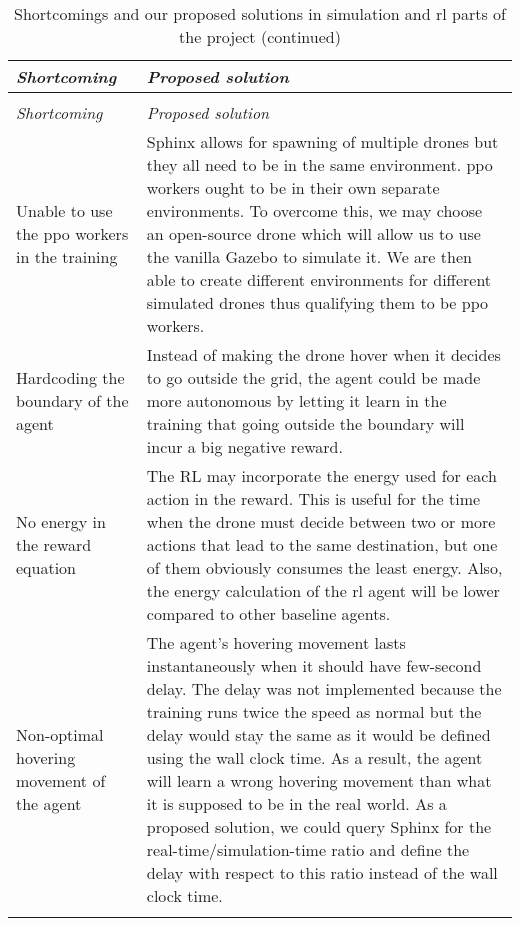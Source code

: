 \documentclass[../main.tex]{subfiles}
\begin{document}
\begin{center}
    \begin{xltabular}{\textwidth}{ X X }
        \caption{Shortcomings and our proposed solutions in simulation
        and \gls{rl} parts of the project.}
        \label{tab:shortcomings} \\
        \toprule
        \textit{Shortcoming} 
            & \textit{Proposed solution} \\

        \midrule
        \endfirsthead
        \caption[]{Shortcomings and our proposed solutions in simulation
        and \gls{rl} parts of the project (continued)}\\
        \toprule
        \textit{Shortcoming} 
            & \textit{Proposed solution} \\

        \midrule
        \endhead
        
        Unable to use the \gls{ppo} workers in the training            
        & 
        Sphinx allows for spawning of multiple drones but they all
        need to be in the same environment. 
        \gls{ppo} workers ought to be in their own separate
        environments.
        To overcome this, we may choose an open-source drone
        which will allow us to use the vanilla Gazebo to simulate it.
        We are then able to create different environments for
        different simulated drones thus qualifying them to be
        \gls{ppo} workers.
        \\ \addlinespace

        Hardcoding the boundary of the agent
        &
        Instead of making the drone hover when it decides to go
        outside the grid, the agent could be made more autonomous by
        letting it learn in the training that going outside the
        boundary will incur a big negative reward.
        \\ \addlinespace

        No energy in the reward equation
        &
        The RL may incorporate the energy used for each action in the
        reward. This is useful for the time when the drone must decide
        between two or more actions that lead to the same destination,
        but one of them obviously consumes the least energy.
        Also, the energy calculation of the \gls{rl} agent will be
        lower compared to other baseline agents.
        \\ \addlinespace

        Non-optimal hovering movement of the agent
        &
        The agent's hovering movement lasts instantaneously when it
        should have few-second delay.
        The delay was not implemented because the training runs twice
        the speed as normal but the delay would stay the same as it
        would be defined using the wall clock time.
        As a result, the agent will learn a wrong hovering movement
        than what it is supposed to be in the real world.
        As a proposed solution, we could query Sphinx for the
        real-time/simulation-time ratio and define the delay with
        respect to this ratio instead of the wall clock time.
        \\ \addlinespace


\end{xltabular}
\end{center}
\end{document}
